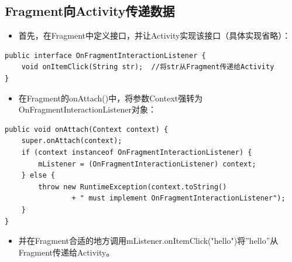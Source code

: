 \documentclass[9pt, b5paaper]{book}
\begin{document}
\subsection{Fragment向Activity传递数据}
\label{sec-3-4-1}
\begin{itemize}
\item 首先，在Fragment中定义接口，并让Activity实现该接口（具体实现省略）：
\end{itemize}
\begin{verbatim}
public interface OnFragmentInteractionListener {
    void onItemClick(String str);  //将str从Fragment传递给Activity
}
\end{verbatim}
\begin{itemize}
\item 在Fragment的onAttach()中，将参数Context强转为OnFragmentInteractionListener对象：
\end{itemize}
\begin{verbatim}
public void onAttach(Context context) {
    super.onAttach(context);
    if (context instanceof OnFragmentInteractionListener) {
        mListener = (OnFragmentInteractionListener) context;
    } else {
        throw new RuntimeException(context.toString()
                + " must implement OnFragmentInteractionListener");
    }
}
\end{verbatim}
\begin{itemize}
\item 并在Fragment合适的地方调用mListener.onItemClick("hello")将”hello”从Fragment传递给Activity。
\end{itemize}
\end{document}
